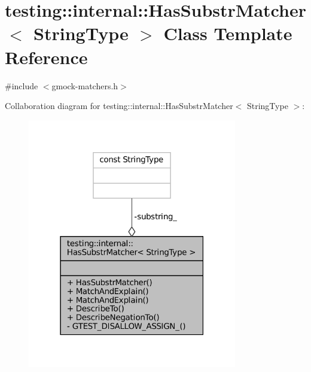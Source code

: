 \hypertarget{classtesting_1_1internal_1_1HasSubstrMatcher}{}\section{testing\+:\+:internal\+:\+:Has\+Substr\+Matcher$<$ String\+Type $>$ Class Template Reference}
\label{classtesting_1_1internal_1_1HasSubstrMatcher}


{\ttfamily \#include $<$gmock-\/matchers.\+h$>$}



Collaboration diagram for testing\+:\+:internal\+:\+:Has\+Substr\+Matcher$<$ String\+Type $>$\+:
\nopagebreak
\begin{figure}[H]
\begin{center}
\leavevmode
\includegraphics[width=259pt]{classtesting_1_1internal_1_1HasSubstrMatcher__coll__graph}
\end{center}
\end{figure}
